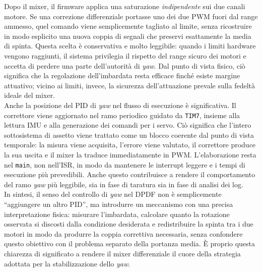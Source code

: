 \documentclass[11pt]{report}
\begin{document}
	Dopo il mixer, il firmware applica una saturazione \emph{indipendente} sui due canali motore. Se una correzione differenziale portasse uno dei due PWM fuori dal range ammesso, quel comando viene semplicemente tagliato al limite, senza ricostruire in modo esplicito una nuova coppia di segnali che preservi esattamente la media di spinta. Questa scelta è conservativa e molto leggibile: quando i limiti hardware vengono raggiunti, il sistema privilegia il rispetto del range sicuro dei motori e accetta di perdere una parte dell'autorità di \textit{yaw}. Dal punto di vista fisico, ciò significa che la regolazione dell'imbardata resta efficace finché esiste margine attuativo; vicino ai limiti, invece, la sicurezza dell'attuazione prevale sulla fedeltà ideale del mixer.\\
	Anche la posizione del PID di \textit{yaw} nel flusso di esecuzione è significativa. Il correttore viene aggiornato nel ramo periodico guidato da \texttt{TIM7}, insieme alla lettura IMU e alla generazione dei comandi per i servo. Ciò significa che l'intero sottosistema di assetto viene trattato come un blocco coerente dal punto di vista temporale: la misura viene acquisita, l'errore viene valutato, il correttore produce la sua uscita e il mixer la traduce immediatamente in PWM. L'elaborazione resta nel \texttt{main}, non nell'ISR, in modo da mantenere le interrupt leggere e i tempi di esecuzione più prevedibili. Anche questo contribuisce a rendere il comportamento del ramo \textit{yaw} più leggibile, sia in fase di taratura sia in fase di analisi dei log.\\
	In sintesi, il senso del controllo di \textit{yaw} nel DPDF non è semplicemente ``aggiungere un altro PID'', ma introdurre un meccanismo con una precisa interpretazione fisica: misurare l'imbardata, calcolare quanto la rotazione osservata si discosti dalla condizione desiderata e redistribuire la spinta tra i due motori in modo da produrre la coppia correttiva necessaria, senza confondere questo obiettivo con il problema separato della portanza media. È proprio questa chiarezza di significato a rendere il mixer differenziale il cuore della strategia adottata per la stabilizzazione dello \textit{yaw}. 

	
\end{document}
